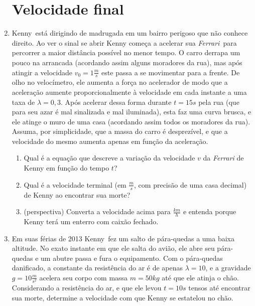 \documentclass[a4paper]{article}
\begin{document}
\begin{enumerate}

\section{Velocidade final}

\item Kenny\circledR\ está dirigindo de madrugada em um bairro
  perigoso que não conhece direito. Ao ver o sinal se abrir Kenny
  começa a acelerar sua {\it Ferrari}\circledR\ para percorrer a maior
  distância possível no menor tempo. O carro derrapa um pouco na
  arrancada (acordando assim alguns moradores da rua), mas após
  atingir a velocidade $v_0 = 1\frac{m}{s}$ este passa a se movimentar
  para a frente. De olho no velocímetro, ele aumenta a força no
  acelerador de modo que a aceleração aumente proporcionalmente à
  velocidade em cada instante a uma taxa de $\lambda=0,3$. Após
  acelerar dessa forma durante $t=15s$ pela rua (que para seu azar é
  mal sinalizada e mal iluminada), esta faz uma curva brusca, e ele
  atinge o muro de uma casa (acordando assim todos os moradores da
  rua). Assuma, por simplicidade, que a massa do carro é desprezível,
  e que a velocidade do mesmo aumenta apenas em função da aceleração.

  \begin{enumerate}
  \item Qual é a equação que descreve a variação da velocidade $v$ da
    {\it Ferrari} de Kenny em função do tempo $t$?
  \item Qual é a velocidade terminal (em $\frac{m}{s}$, com precisão
    de uma casa decimal) de Kenny ao encontrar sua morte?
  \item (perspectiva) Converta a velocidade acima para $\frac{km}{h}$
    e entenda porque Kenny terá um enterro com caixão fechado.
  \end{enumerate}

\item Em suas férias de 2013 Kenny\circledR\ fez um salto de
  pára-quedas a uma baixa altitude. No exato instante em que ele salta
  do avião, ele abre seu pára-quedas e um abutre passa e fura o
  equipamento. Com o pára-quedas danificado, a constante da
  resistência do ar é de apenas $\lambda=10$, e a gravidade
  $g=10\frac{m}{s^2}$ acelera seu corpo com massa $m=50kg$ até que ele
  atinja o chão. Considerando a resistência do ar, e que ele levou
  $t=10s$ tensos até encontrar sua morte, determine a velocidade com
  que Kenny se estatelou no chão.


\end{enumerate}
\end{document}
